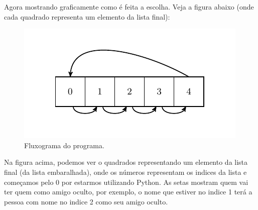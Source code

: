 Agora mostrando graficamente como é feita a escolha.
Veja a figura abaixo (onde cada quadrado representa um elemento da lista final):

\begin{figure}[H]
\centering
\includegraphics[width=.7\textwidth]{00_7_imagem_2}
\caption{Fluxograma do programa.}
\end{figure}

Na figura acima, podemos ver o quadrados representando um elemento da lista final (da lista embaralhada), onde os números representam os indices da lista e começamos pelo 0 por estarmos utilizando Python.
As setas mostram quem vai ter quem como amigo oculto, por exemplo, o nome que estiver no indice 1 terá a pessoa com nome no indice 2 como seu amigo oculto.






